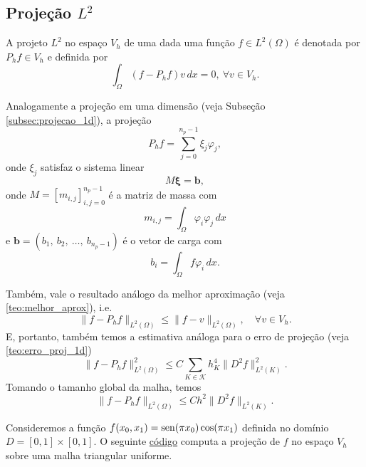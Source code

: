 \subsection{Projeção $L^2$}
\badgeRevisar


A projeto $L^2$ no espaço $V_h$ de uma dada uma função $f\in L^2(\Omega)$  é denotada por $P_hf\in V_h$ e definida por
\begin{equation}
  \int_\Omega (f-P_hf)v\,dx = 0,~\forall v\in V_h.
\end{equation}

Analogamente a projeção em uma dimensão (veja Subseção \ref{subsec:projecao_1d}), a projeção
\begin{equation}
  P_h f = \sum_{j=0}^{n_p-1} \xi_j\varphi_j,
\end{equation}
onde $\xi_j$ satisfaz o sistema linear
\begin{equation}
  M\pmb{\xi} = \pmb{b},
\end{equation}
onde $M = [m_{i,j}]_{i,j=0}^{n_p-1}$ é a matriz de massa com
\begin{equation}
  m_{i,j} = \int_{\Omega} \varphi_i\varphi_j\,dx
\end{equation}
e $\pmb{b} = (b_1,~b_2,~\dotsc,~b_{n_p-1})$ é o vetor de carga com
\begin{equation}
  b_i = \int_\Omega f\varphi_i\,dx.
\end{equation}

Também, vale o resultado análogo da melhor aproximação (veja \ref{teo:melhor_aprox}), i.e.
\begin{equation}
  \|f-P_hf\|_{L^2(\Omega)} \leq \|f - v\|_{L^2(\Omega)},\quad\forall v\in V_h.
\end{equation}
E, portanto, também temos a estimativa análoga para o erro de projeção (veja \ref{teo:erro_proj_1d})
\begin{equation}
  \|f-P_hf\|_{L^2(\Omega)}^2 \leq C\sum_{K\in\mathcal{K}} h_K^4\|D^2 f\|_{L^2(K)}^2.
\end{equation}
Tomando o tamanho global da malha, temos
\begin{equation}\label{eq:erro_projec_2d}
  \|f-P_hf\|_{L^2(\Omega)} \leq Ch^2\|D^2 f\|_{L^2(K)}.
\end{equation}

\ifispython
\begin{ex}\label{ex:projec}
Consideremos a função $f(x_0,x_1) = \operatorname{sen}(\pi x_0)\cos(\pi x_1)$ definida no domínio $D = [0, 1]\times [0, 1]$. O seguinte \href{https://github.com/phkonzen/notas/blob/master/src/MetodoElementosFinitos/cap_mef2d/dados/ex_projec/ex_projec.py}{código} computa a projeção de $f$ no espaço $V_h$ sobre uma malha triangular uniforme.


\end{ex}
\fi

